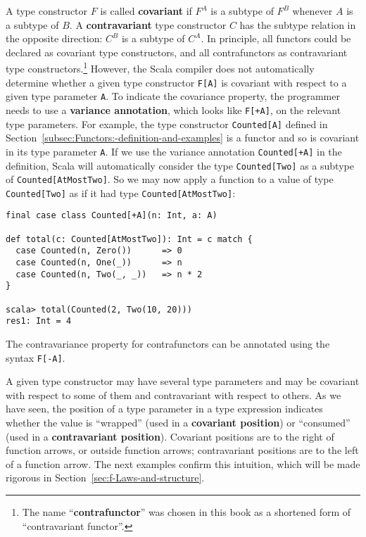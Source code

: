 A type constructor $F$ is called \textbf{covariant}
if $F^{A}$ is a subtype of $F^{B}$ whenever $A$ is a subtype of
$B$. A \textbf{contravariant}
type constructor $C$ has the subtype relation in the opposite direction:
$C^{B}$ is a subtype of $C^{A}$. In principle, all functors could
be declared as covariant type constructors, and all contrafunctors
as contravariant type constructors.\footnote{The name \textsf{``}\textbf{contrafunctor}\textsf{''} was chosen
in this book as a shortened form of \textsf{``}contravariant
functor\textsf{''}.} However, the Scala compiler does not automatically determine whether
a given type constructor \lstinline!F[A]! is covariant with respect
to a given type parameter \lstinline!A!. To indicate the covariance
property, the programmer needs to use a \textbf{variance
annotation}, which looks like \lstinline!F[+A]!, on the relevant
type parameters. For example, the type constructor \lstinline!Counted[A]!
defined in Section~\ref{subsec:Functors:-definition-and-examples}
is a functor and so is covariant in its type parameter \lstinline!A!.
If we use the variance annotation \lstinline!Counted[+A]! in the
definition, Scala will automatically consider the type \lstinline!Counted[Two]!
as a subtype of \lstinline!Counted[AtMostTwo]!. So we may now apply
a function to a value of type \lstinline!Counted[Two]! as if it had
type \lstinline!Counted[AtMostTwo]!:
\begin{lstlisting}
final case class Counted[+A](n: Int, a: A)

def total(c: Counted[AtMostTwo]): Int = c match {
  case Counted(n, Zero())      => 0
  case Counted(n, One(_))      => n
  case Counted(n, Two(_, _))   => n * 2
}

scala> total(Counted(2, Two(10, 20)))
res1: Int = 4
\end{lstlisting}

The contravariance property for contrafunctors can be annotated using
the syntax \lstinline!F[-A]!.

A given type constructor may have several type parameters and may
be covariant with respect to some of them and contravariant with respect
to others. As we have seen, the position of a type parameter in a
type expression indicates whether the value is \textsf{``}wrapped\textsf{''} (used
in a \textbf{covariant position}) or \textsf{``}consumed\textsf{''}
(used in a \textbf{contravariant position}).
Covariant positions are to the right of function arrows, or outside
function arrows; contravariant positions are to the left of a function
arrow. The next examples confirm this intuition, which will be made
rigorous in Section~\ref{sec:f-Laws-and-structure}.

